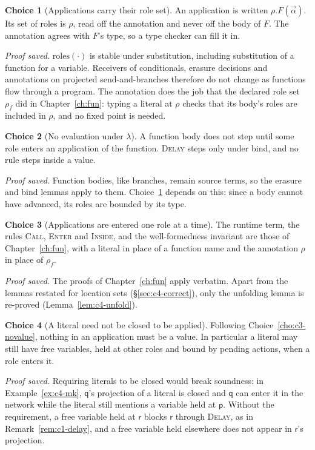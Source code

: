 \documentclass[11pt]{report}
\theoremstyle{plain}
\theoremstyle{definition}
\newtheorem{choice}{Choice}[chapter]
\theoremstyle{remark}
\newcommand{\pp}{\mathsf{p}}
\newcommand{\qq}{\mathsf{q}}
\newcommand{\rr}{\mathsf{r}}
\newcommand{\roles}[1]{\mathrm{roles}(#1)}
\newcommand{\rn}[1]{{\normalfont\scshape #1}}
\begin{document}
\begin{choice}[Applications carry their role set]\label{cho:c4-annot}
  An application is written $\rho.F(\vec\alpha)$.  Its set of roles is
  $\rho$, read off the annotation and never off the body of $F$.  The
  annotation agrees with $F$'s type, so a type checker can fill it in.

  \emph{Proof saved.}  $\roles{\cdot}$ is stable under substitution, including
  substitution of a function for a variable.  Receivers of conditionals,
  erasure decisions and annotations on projected send-and-branches therefore
  do not change as functions flow through a program.  The annotation does
  the job that the declared role set $\rho_f$ did in Chapter~\ref{ch:fun}:
  typing a literal at $\rho$ checks that its body's roles are included in
  $\rho$, and no fixed point is needed.
\end{choice}

\begin{choice}[No evaluation under $\lambda$]\label{cho:c4-nolambda}
  A function body does not step until some role enters an application of the
  function.  \rn{Delay} steps only under bind, and no rule steps inside a
  value.

  \emph{Proof saved.}  Function bodies, like branches, remain source terms,
  so the erasure and bind lemmas apply to them.  Choice~\ref{cho:c4-annot}
  depends on this: since a body cannot have advanced, its roles are bounded
  by its type.
\end{choice}

\begin{choice}[Applications are entered one role at a time]\label{cho:c4-enter}
  The runtime term, the rules \rn{Call}, \rn{Enter} and \rn{Inside}, and the
  well-formedness invariant are those of Chapter~\ref{ch:fun}, with a literal
  in place of a function name and the annotation $\rho$ in place of $\rho_f$.

  \emph{Proof saved.}  The proofs of Chapter~\ref{ch:fun} apply verbatim.
  Apart from the lemmas restated for location sets (\S\ref{sec:c4-correct}),
  only the unfolding lemma is re-proved (Lemma~\ref{lem:c4-unfold}).
\end{choice}

\begin{choice}[A literal need not be closed to be applied]\label{cho:c4-open}
  Following Choice~\ref{cho:c3-novalue}, nothing in an application must be a
  value.  In particular a literal may still have free variables, held at
  other roles and bound by pending actions, when a role enters it.

  \emph{Proof saved.}  Requiring literals to be closed would break
  soundness: in Example~\ref{ex:c4-mk}, $\qq$'s projection of a literal is closed and
  $\qq$ can enter it in the network while the literal still mentions a
  variable held at $\pp$.  Without the requirement, a free variable held at
  $\rr$ blocks $\rr$ through \rn{Delay}, as in
  Remark~\ref{rem:c1-delay}, and a free variable held elsewhere does not appear
  in $\rr$'s projection.
\end{choice}
\end{document}
